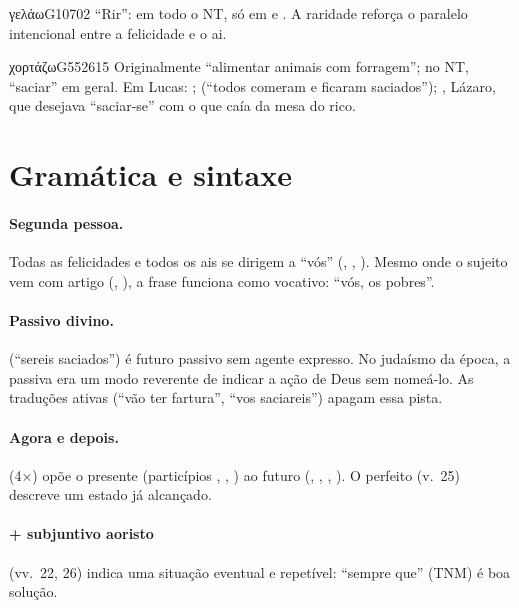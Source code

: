 \begin{lexico}{γελάω}{G1070}{2}
\enquote{Rir}: em todo o NT, só em  e . A raridade
reforça o paralelo intencional entre a felicidade e o ai.
\end{lexico}

\begin{lexico}{χορτάζω}{G5526}{15}
Originalmente \enquote{alimentar animais com forragem}; no NT, \enquote{saciar}
em geral. Em Lucas: ;  (\enquote{todos comeram e ficaram
saciados}); , Lázaro, que desejava \enquote{saciar-se} com o que caía
da mesa do rico.
\end{lexico}

\section{Gramática e sintaxe}

\paragraph{Segunda pessoa.} Todas as felicidades e todos os ais se dirigem a
\enquote{vós} (, , ). Mesmo onde o
sujeito vem com artigo (, ), a frase funciona
como vocativo: \enquote{vós, os pobres}.

\paragraph{Passivo divino.}  (\enquote{sereis saciados}) é
futuro passivo sem agente expresso. No judaísmo da época, a passiva era um
modo reverente de indicar a ação de Deus sem nomeá-lo. As traduções ativas
(\enquote{vão ter fartura}, \enquote{vos saciareis}) apagam essa pista.

\paragraph{Agora e depois.}  (4×) opõe o presente (particípios
, , ) ao futuro
(, , , ). O perfeito
 (v.~25) descreve um estado já alcançado.

\paragraph{ + subjuntivo aoristo} (vv.~22, 26) indica uma
situação eventual e repetível: \enquote{sempre que} (TNM) é boa solução.

